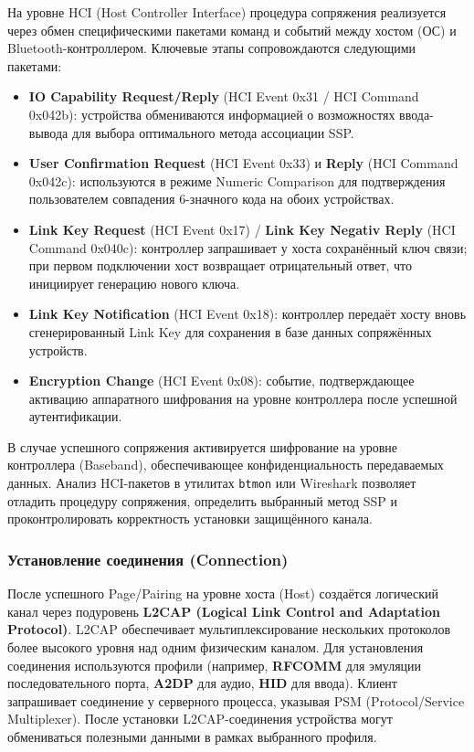 На уровне HCI (Host Controller Interface) процедура сопряжения реализуется через обмен специфическими пакетами команд и событий между хостом (ОС) и Bluetooth-контроллером. Ключевые этапы сопровождаются следующими пакетами:
\begin{itemize}[nosep]
    \item \textbf{IO Capability Request/Reply} (HCI Event 0x31 / HCI Command 0x042b): устройства обмениваются информацией о возможностях ввода-вывода для выбора оптимального метода ассоциации SSP.
    \item \textbf{User Confirmation Request} (HCI Event 0x33) и \textbf{Reply} (HCI Command 0x042c): используются в режиме Numeric Comparison для подтверждения пользователем совпадения 6-значного кода на обоих устройствах.
    \item \textbf{Link Key Request} (HCI Event 0x17) / \textbf{Link Key Negativ Reply} (HCI Command 0x040c): контроллер запрашивает у хоста сохранённый ключ связи; при первом подключении хост возвращает отрицательный ответ, что инициирует генерацию нового ключа.
    \item \textbf{Link Key Notification} (HCI Event 0x18): контроллер передаёт хосту вновь сгенерированный Link Key для сохранения в базе данных сопряжённых устройств.
    \item \textbf{Encryption Change} (HCI Event 0x08): событие, подтверждающее активацию аппаратного шифрования на уровне контроллера после успешной аутентификации.
\end{itemize}

В случае успешного сопряжения активируется шифрование на уровне контроллера (Baseband), обеспечивающее конфиденциальность передаваемых данных. Анализ HCI-пакетов в утилитах \texttt{btmon} или Wireshark позволяет отладить процедуру сопряжения, определить выбранный метод SSP и проконтролировать корректность установки защищённого канала.

\subsubsection{Установление соединения (Connection)}
После успешного Page/Pairing на уровне хоста (Host) создаётся логический канал через подуровень \textbf{L2CAP (Logical Link Control and Adaptation Protocol)}. L2CAP обеспечивает мультиплексирование нескольких протоколов более высокого уровня над одним физическим каналом.
Для установления соединения используются профили (например, \textbf{RFCOMM} для эмуляции последовательного порта, \textbf{A2DP} для аудио, \textbf{HID} для ввода). Клиент запрашивает соединение у серверного процесса, указывая PSM (Protocol/Service Multiplexer). После установки L2CAP-соединения устройства могут обмениваться полезными данными в рамках выбранного профиля.

